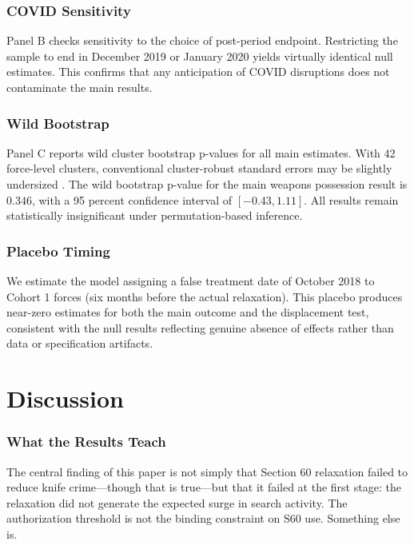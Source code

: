 \documentclass[12pt]{article}
\begin{document}
\subsubsection*{COVID Sensitivity}

Panel B checks sensitivity to the choice of post-period endpoint. Restricting the sample to end in December 2019 or January 2020 yields virtually identical null estimates. This confirms that any anticipation of COVID disruptions does not contaminate the main results.

\subsubsection*{Wild Bootstrap}

Panel C reports wild cluster bootstrap p-values for all main estimates. With 42 force-level clusters, conventional cluster-robust standard errors may be slightly undersized \citep{cameron2008, roodman2019}. The wild bootstrap p-value for the main weapons possession result is $0.346$, with a 95 percent confidence interval of $[-0.43, 1.11]$. All results remain statistically insignificant under permutation-based inference.

\subsubsection*{Placebo Timing}

We estimate the model assigning a false treatment date of October 2018 to Cohort 1 forces (six months before the actual relaxation). This placebo produces near-zero estimates for both the main outcome and the displacement test, consistent with the null results reflecting genuine absence of effects rather than data or specification artifacts.


\section{Discussion}
\label{sec:discussion}

\subsubsection*{What the Results Teach}

The central finding of this paper is not simply that Section 60 relaxation failed to reduce knife crime---though that is true---but that it failed at the first stage: the relaxation did not generate the expected surge in search activity. The authorization threshold is not the binding constraint on S60 use. Something else is.
\end{document}
